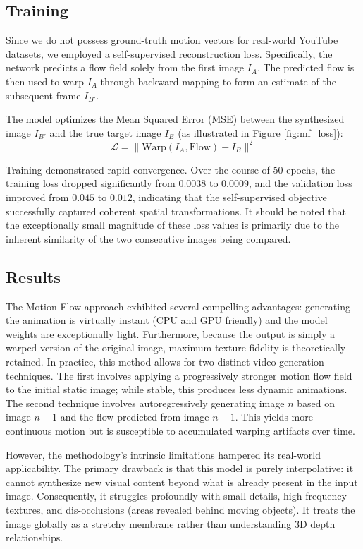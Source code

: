 \documentclass[10pt,twocolumn,letterpaper]{article}
\begin{document}
\subsection{Training}

Since we do not possess ground-truth motion vectors for real-world YouTube datasets, we employed a self-supervised reconstruction loss. Specifically, the network predicts a flow field solely from the first image $I_A$. The predicted flow is then used to warp $I_A$ through backward mapping to form an estimate of the subsequent frame $I_{B'}$. 

The model optimizes the Mean Squared Error (MSE) between the synthesized image $I_{B'}$ and the true target image $I_B$ (as illustrated in Figure \ref{fig:mf_loss}):
\begin{equation}
\mathcal{L} = \| \text{Warp}(I_A, \text{Flow}) - I_B \|^2
\end{equation}

Training demonstrated rapid convergence. Over the course of 50 epochs, the training loss dropped significantly from $0.0038$ to $0.0009$, and the validation loss improved from $0.045$ to $0.012$, indicating that the self-supervised objective successfully captured coherent spatial transformations. It should be noted that the exceptionally small magnitude of these loss values is primarily due to the inherent similarity of the two consecutive images being compared.

\subsection{Results}

The Motion Flow approach exhibited several compelling advantages: generating the animation is virtually instant (CPU and GPU friendly) and the model weights are exceptionally light. Furthermore, because the output is simply a warped version of the original image, maximum texture fidelity is theoretically retained. In practice, this method allows for two distinct video generation techniques. The first involves applying a progressively stronger motion flow field to the initial static image; while stable, this produces less dynamic animations. The second technique involves autoregressively generating image $n$ based on image $n-1$ and the flow predicted from image $n-1$. This yields more continuous motion but is susceptible to accumulated warping artifacts over time.

However, the methodology's intrinsic limitations hampered its real-world applicability. The primary drawback is that this model is purely interpolative: it cannot synthesize new visual content beyond what is already present in the input image. Consequently, it struggles profoundly with small details, high-frequency textures, and dis-occlusions (areas revealed behind moving objects). It treats the image globally as a stretchy membrane rather than understanding 3D depth relationships. 
\end{document}
